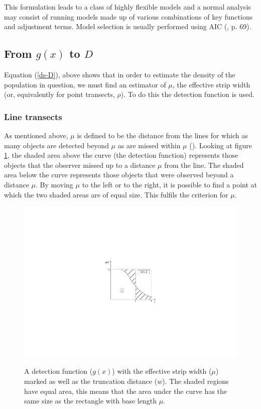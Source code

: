 This formulation leads to a class of highly flexible models and a normal analysis may consist of running models made up of various combinations of key functions and adjustment terms. Model selection is usually performed using AIC (\cite{IDS}, p. 69).

\subsection{From $g(x)$ to $D$}
\label{gtoD}
Equation (\ref{ds-D}), above shows that in order to estimate the density of the population in question, we must find an estimator of $\mu$, the effective strip width (or, equivalently for point transects, $\rho$). To do this the detection function is used.

\subsubsection{Line transects} 
As mentioned above, $\mu$ is defined to be the distance from the lines for which as many objects are detected beyond $\mu$ as are missed within $\mu$ (\cite{eenviron}). Looking at figure \ref{ds-mu-explanation}, the shaded area above the curve (the detection function) represents those objects that the observer missed up to a distance $\mu$ from the line. The shaded area below the curve represents those objects that were observed beyond a distance $\mu$. By moving $\mu$ to the left or to the right, it is possible to find a point at which the two shaded areas are of equal size. This fulfils the criterion for $\mu$.

\begin{figure}
\centering
\includegraphics{intro/figs/muexplanation.pdf}\\
\caption{A detection function ($g(x)$) with the effective strip width ($\mu$) marked as well as the truncation distance ($w$). The shaded regions have equal area, this means that the area under the curve has the same size as the rectangle with base length $\mu$.}
\label{ds-mu-explanation}
\end{figure}

